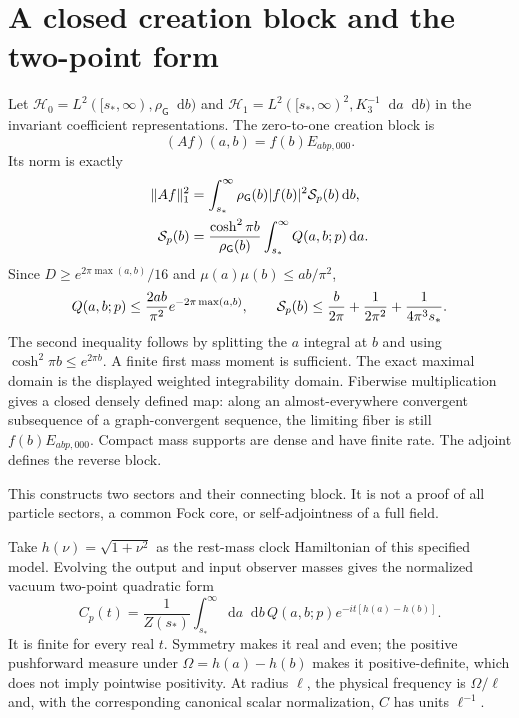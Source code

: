 \documentclass[11pt,a4paper]{article}
\newcommand{\dd}{\mathop{}\!\mathrm d}
\newcommand{\HH}{\mathcal H}
\begin{document}
\newpage
\section{A closed creation block and the two-point form}
Let $\HH_0=L^2([s_*,\infty),\rho_{\mathsf G}\dd b)$ and
$\HH_1=L^2([s_*,\infty)^2,K_3^{-1}\dd a\dd b)$ in the invariant coefficient
representations. The zero-to-one creation block is
\[
 (Af)(a,b)=f(b)E_{abp,000}.
\]
Its norm is exactly
\begin{align}
 \|Af\|_1^2&=\int_{s_*}^\infty\rho_{\mathsf G}(b)|f(b)|^2
                           {\cal S}_p(b)\dd b,\\
 {\cal S}_p(b)&=\frac{\cosh^2\pi b}{\rho_{\mathsf G}(b)}
                     \int_{s_*}^\infty Q(a,b;p)\dd a .
\end{align}
Since $D\ge e^{2\pi\max(a,b)}/16$ and
$\mu(a)\mu(b)\le ab/\pi^2$,
\begin{equation}
 Q(a,b;p)\le\frac{2ab}{\pi^2}e^{-2\pi\max(a,b)},\qquad
 {\cal S}_p(b)\le\frac{b}{2\pi}+\frac{1}{2\pi^2}
                         +\frac{1}{4\pi^3s_*}.
\end{equation}
The second inequality follows by splitting the $a$ integral at $b$ and
using $\cosh^2\pi b\le e^{2\pi b}$. A finite first mass moment is sufficient.
The exact maximal domain is the displayed weighted integrability domain.
Fiberwise multiplication gives a closed densely defined map: along an
almost-everywhere convergent subsequence of a graph-convergent sequence,
the limiting fiber is still $f(b)E_{abp,000}$. Compact mass supports are
dense and have finite rate. The adjoint defines the reverse block.

This constructs two sectors and their connecting block. It is not a proof
of all particle sectors, a common Fock core, or self-adjointness of a full field.

Take $h(\nu)=\sqrt{1+\nu^2}$ as the rest-mass clock Hamiltonian of this
specified model. Evolving the output and input observer masses gives
the normalized vacuum two-point quadratic form
\begin{equation}\boxed{
 C_p(t)=\frac1{Z(s_*)}\int_{s_*}^\infty\!\dd a\dd b\,
 Q(a,b;p)e^{-it[h(a)-h(b)]}.}
\end{equation}
It is finite for every real $t$. Symmetry makes it real and even;
the positive pushforward measure under $\Omega=h(a)-h(b)$ makes it
positive-definite, which does not imply pointwise positivity.
At radius $\ell$, the physical frequency is $\Omega/\ell$ and, with the
corresponding canonical scalar normalization, $C$ has units $\ell^{-1}$.
\end{document}
